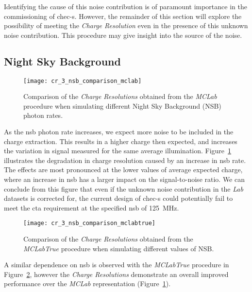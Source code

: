 Identifying the cause of this noise contribution is of paramount importance in the commissioning of \gls{chec-s}. However, the remainder of this section will explore the possibility of meeting the \textit{Charge Resolution} even in the presence of this unknown noise contribution. This procedure may give insight into the source of the noise.

\subsection{Night Sky Background}

\begin{figure}
	\centering
    \texttt{[image: cr\_3\_nsb\_comparison\_mclab]} 
	\caption[Comparison of the \textit{Charge Resolution} at different NSBs.]{Comparison of the \textit{Charge Resolutions} obtained from the \textit{MCLab} procedure when simulating different Night Sky Background (NSB) photon rates.}
	\label{fig:cr_3_nsb_comparison_mclab}
\end{figure}

As the \gls{nsb} photon rate increases, we expect more noise to be included in the charge extraction. This results in a higher charge then expected, and increases the variation in signal measured for the same average illumination. Figure~\ref{fig:cr_3_nsb_comparison_mclab} illustrates the degradation in charge resolution caused by an increase in \gls{nsb} rate. The effects are most pronounced at the lower values of average expected charge, where an increase in \gls{nsb} has a larger impact on the signal-to-noise ratio. We can conclude from this figure that even if the unknown noise contribution in the \textit{Lab} datasets is corrected for, the current design of \gls{chec-s} could potentially fail to meet the \gls{cta} requirement at the specified \gls{nsb} of \SI{125}{MHz}.

\begin{figure}
	\centering
    \texttt{[image: cr\_3\_nsb\_comparison\_mclabtrue]} 
	\caption[Comparison of the \textit{Charge Resolution} at different NSBs using the \textit{MCLabTrue} procedure.]{Comparison of the \textit{Charge Resolutions} obtained from the \textit{MCLabTrue} procedure when simulating different values of NSB.}
	\label{fig:cr_3_nsb_comparison_mclabtrue}
\end{figure}

A similar dependence on \gls{nsb} is observed with the \textit{MCLabTrue} procedure in Figure~\ref{fig:cr_3_nsb_comparison_mclabtrue}, however the \textit{Charge Resolutions} demonstrate an overall improved performance over the \textit{MCLab} representation (Figure~\ref{fig:cr_3_nsb_comparison_mclab}).

